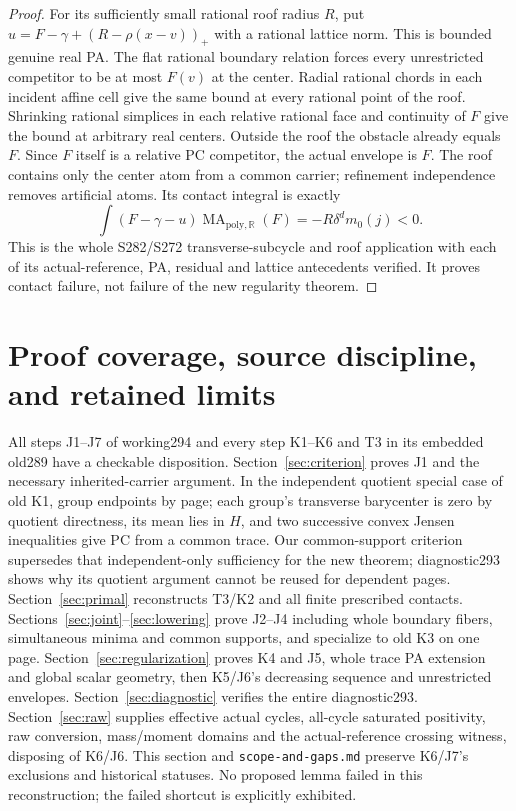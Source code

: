 \documentclass[11pt]{article}
\newcommand{\R}{\mathbb R}
\newcommand{\MA}{\operatorname{MA}_{\mathrm{poly},\R}}
\begin{document}
\begin{proof}
For its sufficiently small rational roof radius $R$, put $u=F-\gamma+(R-\rho(x-v))_+$ with a rational lattice norm. This is bounded genuine real PA. The flat rational boundary relation forces every unrestricted competitor to be at most $F(v)$ at the center. Radial rational chords in each incident affine cell give the same bound at every rational point of the roof. Shrinking rational simplices in each relative rational face and continuity of $F$ give the bound at arbitrary real centers. Outside the roof the obstacle already equals $F$. Since $F$ itself is a relative PC competitor, the actual envelope is $F$. The roof contains only the center atom from a common carrier; refinement independence removes artificial atoms. Its contact integral is exactly
\[
 \int(F-\gamma-u)\MA(F)=-R\delta^d m_0(j)<0.
\]
This is the whole S282/S272 transverse-subcycle and roof application with each of its actual-reference, PA, residual and lattice antecedents verified. It proves contact failure, not failure of the new regularity theorem.
\end{proof}

\section{Proof coverage, source discipline, and retained limits}\label{sec:evidence}
All steps J1--J7 of working294 and every step K1--K6 and T3 in its embedded old289 have a checkable disposition. Section~\ref{sec:criterion} proves J1 and the necessary inherited-carrier argument. In the independent quotient special case of old K1, group endpoints by page; each group's transverse barycenter is zero by quotient directness, its mean lies in $H$, and two successive convex Jensen inequalities give PC from a common trace. Our common-support criterion supersedes that independent-only sufficiency for the new theorem; diagnostic293 shows why its quotient argument cannot be reused for dependent pages. Section~\ref{sec:primal} reconstructs T3/K2 and all finite prescribed contacts. Sections~\ref{sec:joint}--\ref{sec:lowering} prove J2--J4 including whole boundary fibers, simultaneous minima and common supports, and specialize to old K3 on one page. Section~\ref{sec:regularization} proves K4 and J5, whole trace PA extension and global scalar geometry, then K5/J6's decreasing sequence and unrestricted envelopes. Section~\ref{sec:diagnostic} verifies the entire diagnostic293. Section~\ref{sec:raw} supplies effective actual cycles, all-cycle saturated positivity, raw conversion, mass/moment domains and the actual-reference crossing witness, disposing of K6/J6. This section and \texttt{scope-and-gaps.md} preserve K6/J7's exclusions and historical statuses. No proposed lemma failed in this reconstruction; the failed shortcut is explicitly exhibited.
\end{document}
